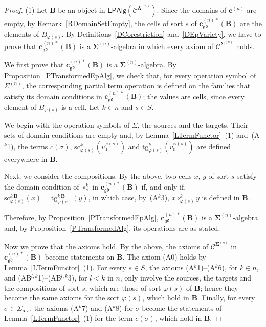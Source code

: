 \documentclass[a4paper, reqno
]{amsart}
\newcommand{\sig}[1]{\mathbf{#1}}             %
\newcommand{\spec}[1]{\boldsymbol{\mathcal{#1}}} %
\newcommand{\gd}{\mathfrak{gd}}              %
\newcommand{\src}{\mathrm{sc}}
\newcommand{\tgt}{\mathrm{tg}}
\theoremstyle{plain}
\theoremstyle{definition}
\begin{document}
\begin{proof}
(1) Let $\mathbf{B}$ be an object in $\mathsf{EPAlg}(\spec{C}^{\sig{\Lambda}^{(n)}})$.
Since the domains of $\mathbf{c}^{(n)}$ are empty, by Remark~\ref{RDomainSetEmpty}, the cells of sort $s$ of $\mathbf{c}^{(n)\ast}_{\gd}(\mathbf{B})$ are the elements of $B_{\varphi(s)}$.
By Definitions~\ref{DCorestriction} and~\ref{DEpVariety}, we have to prove that $\mathbf{c}^{(n)\ast}_{\gd}(\mathbf{B})$ is a $\sig{\Sigma}^{(n)}$-algebra in which every axiom of $\mathcal{C}^{\sig{\Sigma}^{(n)}}$ holds.

We first prove that $\mathbf{c}^{(n)\ast}_{\gd}(\mathbf{B})$ is a $\sig{\Sigma}^{(n)}$-algebra.
By Proposition~\ref{PTransformedEpAlg}, we check that, for every operation symbol of $\Sigma^{(n)}$, the corresponding partial term operation is defined on the families that satisfy its domain conditions in $\mathbf{c}^{(n)\ast}_{\gd}(\mathbf{B})$; the values are cells, since every element of $B_{\varphi(s)}$ is a cell.
Let $k\in n$ and $s\in S$.

We begin with the operation symbols of $\Sigma$, the sources and the targets.
Their sets of domain conditions are empty and, by Lemma~\ref{LTermFunctor}~(1) and~(A$^{k}$1), the terms $c(\sigma)$, $\src^{k}_{\varphi(s)}(v^{\varphi(s)}_{0})$ and $\tgt^{k}_{\varphi(s)}(v^{\varphi(s)}_{0})$ are defined everywhere in $\mathbf{B}$.

Next, we consider the compositions.
By the above, two cells $x$, $y$ of sort $s$ satisfy the domain condition of $\circ^{k}_{s}$ in $\mathbf{c}^{(n)\ast}_{\gd}(\mathbf{B})$ if, and only if, $\src^{k\,\mathbf{B}}_{\varphi(s)}(x)=\tgt^{k\,\mathbf{B}}_{\varphi(s)}(y)$, in which case, by~(A$^{k}$3), $x\circ^{k}_{\varphi(s)}y$ is defined in $\mathbf{B}$.

Therefore, by Proposition~\ref{PTransformedEpAlg}, $\mathbf{c}^{(n)\ast}_{\gd}(\mathbf{B})$ is a $\sig{\Sigma}^{(n)}$-algebra and, by Proposition~\ref{PTransformedAlg}, its operations are as stated.

Now we prove that the axioms hold.
By the above, the axioms of $\spec{C}^{\sig{\Sigma}^{(n)}}$ in $\mathbf{c}^{(n)\ast}_{\gd}(\mathbf{B})$ become statements on $\mathbf{B}$.
The axiom (A0) holds by Lemma~\ref{LTermFunctor}~(1).
For every $s\in S$, the axioms (A$^{k}$1)--(A$^{k}$6), for $k\in n$, and (AB$^{l,k}$1)--(AB$^{l,k}$3), for $l<k$ in $n$, only involve the sources, the targets and the compositions of sort $s$, which are those of sort $\varphi(s)$ of $\mathbf{B}$; hence they become the same axioms for the sort $\varphi(s)$, which hold in $\mathbf{B}$.
Finally, for every $\sigma\in\Sigma_{\mathbf{s},s}$, the axioms (A$^{k}$7) and (A$^{k}$8) for $\sigma$ become the statements of Lemma~\ref{LTermFunctor}~(1) for the term $c(\sigma)$, which hold in $\mathbf{B}$.


\end{proof}
\end{document}
